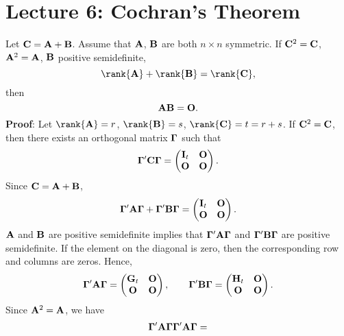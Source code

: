\section{Lecture 6: Cochran's Theorem}
\begin{Lemma}{}{}
    Let $ \mathbf{C}=\mathbf{A}+\mathbf{B} $. Assume that
    $ \mathbf{A} $, $ \mathbf{B} $ are both $ n\times n $ symmetric.
    If $ \mathbf{C}^2=\mathbf{C} $, $ \mathbf{A}^2=\mathbf{A} $,
    $ \mathbf{B} $ positive semidefinite,
    \[ \rank{\Matrix{A}}+\rank{\Matrix{B}}=\rank{\Matrix{C}}, \]
    then
    \[ \mathbf{A}\mathbf{B}=\mathbf{O}. \]
    \tcblower{}
    \textbf{Proof}: Let $ \rank{\Matrix{A}}=r $, $ \rank{\Matrix{B}}=s $,
    $ \rank{\Matrix{C}}=t=r+s $. If $ \mathbf{C}^2=\mathbf{C} $, then there
    exists an orthogonal matrix $ \mathbf{\Gamma} $ such that
    \[ \mathbf{\Gamma}'\mathbf{C}\mathbf{\Gamma}=
        \begin{pmatrix}
            \mathbf{I}_t & \mathbf{O} \\
            \mathbf{O}   & \mathbf{O}
        \end{pmatrix}. \]
    Since $ \mathbf{C}=\mathbf{A}+\mathbf{B} $,
    \[ \mathbf{\Gamma}'\mathbf{A}\mathbf{\Gamma}+\mathbf{\Gamma}'\mathbf{B}\mathbf{\Gamma}
        =\begin{pmatrix}
            \mathbf{I}_t & \mathbf{O} \\
            \mathbf{O}   & \mathbf{O}
        \end{pmatrix}. \]
    $ \mathbf{A} $ and $ \mathbf{B} $ are positive semidefinite implies that
    $ \mathbf{\Gamma}'\mathbf{A\Gamma} $ and $ \mathbf{\Gamma}'\mathbf{B\Gamma} $
    are positive semidefinite. If the element on the diagonal is zero, then the corresponding
    row and columns are zeros. Hence,
    \[ \mathbf{\Gamma}'\mathbf{A\Gamma}=\begin{pmatrix}
            \mathbf{G}_t & \mathbf{O} \\
            \mathbf{O}   & \mathbf{O}
        \end{pmatrix},\qquad
        \mathbf{\Gamma}'\mathbf{B\Gamma}=\begin{pmatrix}
            \mathbf{H}_t & \mathbf{O} \\
            \mathbf{O}   & \mathbf{O}
        \end{pmatrix}. \]
    Since $ \mathbf{A}^2=\mathbf{A} $, we have
    \begin{align*}
        \Matrix{\Gamma}'\Matrix{A\Gamma}\Matrix{\Gamma}'\Matrix{A\Gamma}=

\end{align*}
\end{Lemma}
